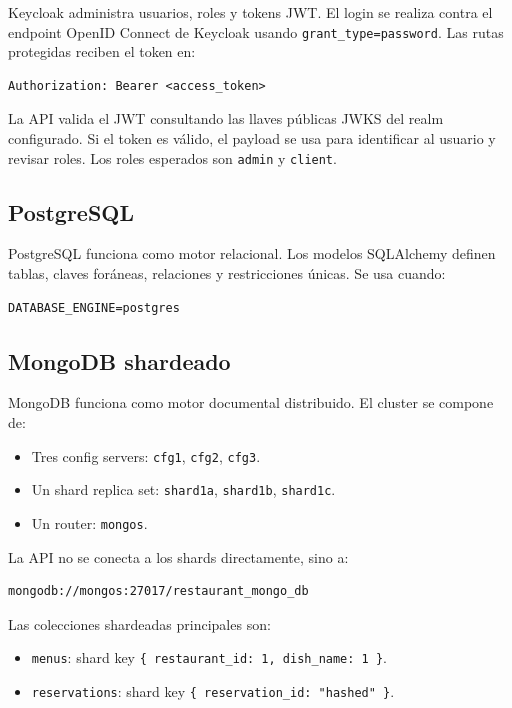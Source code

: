 \documentclass[12pt,letterpaper]{article}
\def\codefile#1{\nolinkurl{#1}}
\begin{document}
Keycloak administra usuarios, roles y tokens JWT. El login se realiza contra el endpoint OpenID Connect de Keycloak usando \codefile{grant\_type=password}. Las rutas protegidas reciben el token en:

\begin{lstlisting}
Authorization: Bearer <access_token>
\end{lstlisting}

La API valida el JWT consultando las llaves públicas JWKS del realm configurado. Si el token es válido, el payload se usa para identificar al usuario y revisar roles. Los roles esperados son \codefile{admin} y \codefile{client}.

\subsection{PostgreSQL}

PostgreSQL funciona como motor relacional. Los modelos SQLAlchemy definen tablas, claves foráneas, relaciones y restricciones únicas. Se usa cuando:

\begin{lstlisting}
DATABASE_ENGINE=postgres
\end{lstlisting}

\subsection{MongoDB shardeado}

MongoDB funciona como motor documental distribuido. El cluster se compone de:

\begin{itemize}
    \item Tres config servers: \codefile{cfg1}, \codefile{cfg2}, \codefile{cfg3}.
    \item Un shard replica set: \codefile{shard1a}, \codefile{shard1b}, \codefile{shard1c}.
    \item Un router: \codefile{mongos}.
\end{itemize}

La API no se conecta a los shards directamente, sino a:

\begin{lstlisting}
mongodb://mongos:27017/restaurant_mongo_db
\end{lstlisting}

Las colecciones shardeadas principales son:

\begin{itemize}
    \item \codefile{menus}: shard key \codefile{\{ restaurant\_id: 1, dish\_name: 1 \}}.
    \item \codefile{reservations}: shard key \codefile{\{ reservation\_id: "hashed" \}}.
\end{itemize}
\end{document}
